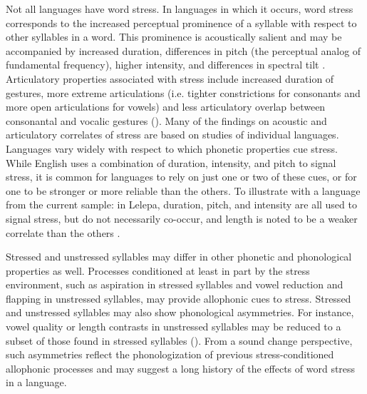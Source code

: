  Not all languages have word stress. In languages in which it occurs, word stress corresponds to the increased perceptual prominence of a syllable with respect to other syllables in a word. This prominence is acoustically salient and may be accompanied by increased duration, differences in pitch (the perceptual analog of fundamental frequency), higher intensity, and differences in spectral tilt \citep{Gordon2011}. Articulatory properties associated with stress include increased duration of gestures, more extreme articulations (i.e. tighter constrictions for consonants and more open articulations for vowels) and less articulatory overlap between consonantal and vocalic gestures (\citealt{BeckmanEdwards1994,Fougeron1999,DeJongEtAl1993}). Many of the findings on acoustic and articulatory correlates of stress are based on studies of individual languages. Languages vary widely with respect to which phonetic properties cue stress. While English uses a combination of duration, intensity, and pitch to signal stress, it is common for languages to rely on just one or two of these cues, or for one to be stronger or more reliable than the others. To illustrate with a language from the current sample: in Lelepa, duration, pitch, and intensity are all used to signal stress, but do not necessarily co-occur, and length is noted to be a weaker correlate than the others \citep[58]{Lacrampe2014}.

  Stressed and unstressed syllables may differ in other phonetic and phonological properties as well. Processes conditioned at least in part by the stress environment, such as aspiration in stressed syllables and vowel reduction and flapping in unstressed syllables, may provide allophonic cues to stress. Stressed and unstressed syllables may also show phonological asymmetries. For instance, vowel quality or length contrasts in unstressed syllables may be reduced to a subset of those found in stressed syllables (\citealt{vanderHulst2010}). From a sound change perspective, such asymmetries reflect the phonologization of previous stress-conditioned allophonic processes and may suggest a long history of the effects of word stress in a language.

